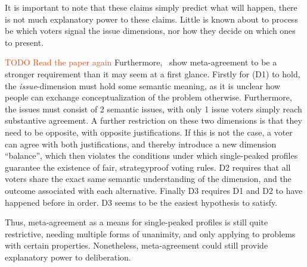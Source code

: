It is important to note that these claims simply predict what will happen,
there is not much explanatory power to these claims. Little is known about to
process be which voters signal the issue dimensions, nor how they decide on
which ones to present.

\textcolor{OrangeRed}{TODO Read the paper again}
Furthermore,~\citet{ottonelliElusiveNotionMetaagreement2013} show
meta-agreement to be a stronger requirement than it may seem at a first glance.
Firstly for (D1) to hold, the \emph{issue}-dimension must hold some semantic
meaning, as it is unclear how people can exchange conceptualization
of the problem otherwise. Furthermore, the issues must consist of 2 semantic
issues, with only 1 issue voters simply reach substantive
agreement. A further restriction on these two dimensions is that they need to
be opposite, with opposite justifications. If this is not the case, a voter can
agree with both justifications, and thereby introduce a new dimension
``balance'', which then violates the conditions under which single-peaked
profiles guarantee the existence of fair, strategyproof voting rules. D2
requires that all voters share the exact same semantic understanding of the
dimension, and the outcome associated with each alternative. Finally D3
requires D1 and D2 to have happened before in order. D3 seems to be the easiest 
hypothesis to satisfy.

Thus, meta-agreement as a means for single-peaked profiles is still quite
restrictive, needing multiple forms of unanimity, and only applying to problems
with certain properties. Nonetheless,  meta-agreement could still provide
explanatory power to deliberation.

